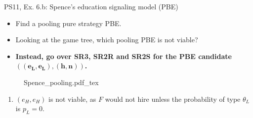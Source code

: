 \begin{frame}{PS11, Ex. 6.b: Spence’s education signaling model (PBE)}
    \begin{multicols}{2}
      \begin{itemize}
        \item[(b)] Find a pooling pure strategy PBE.
        \item[Step 1:] Looking at the game tree, which pooling PBE is not viable?
        \item[Step 2:] \textbf{Instead, go over SR3, SR2R and SR2S for the PBE candidate $\bm{((e_L,e_L),(h,n))}$.}
      \end{itemize}\vspace{-6pt}
      \vfill\null\columnbreak
      \begin{figure}[!h]
        \center{}
        {Spence_pooling.pdf_tex}
      \end{figure}\vspace{-6pt}
      \begin{enumerate}
        \item $(e_H,e_H)$ is not viable, as $F$ would not hire unless the probability of type $\theta_L$ is $p_L=0$.
      \end{enumerate}
      \vfill\null
    \end{multicols}
\end{frame}

